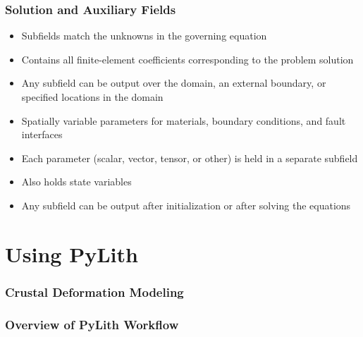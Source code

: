\documentclass[aspectratio=169]{beamer}
\begin{document}
\begin{frame}
  \frametitle{Solution and Auxiliary Fields}
  \summary{}

  \begin{itemize}
    \begin{itemize}
    \item Subfields match the unknowns in the governing equation
    \item Contains all finite-element coefficients corresponding to the problem solution
    \item Any subfield can be output over the domain, an external boundary, or specified locations in the domain
    \end{itemize}
    \begin{itemize}
    \item Spatially variable parameters for materials, boundary conditions, and fault interfaces
    \item Each parameter (scalar, vector, tensor, or other) is held in a separate subfield
    \item Also holds state variables
    \item Any subfield can be output after initialization or after solving the equations
    \end{itemize}
  \end{itemize}

\end{frame}


\section{Using PyLith}

\begin{frame}
  \frametitle{Crustal Deformation Modeling}

  
\end{frame}


\begin{frame}
  \frametitle{Overview of PyLith Workflow}
  \summary{}

\end{frame}
\end{document}
